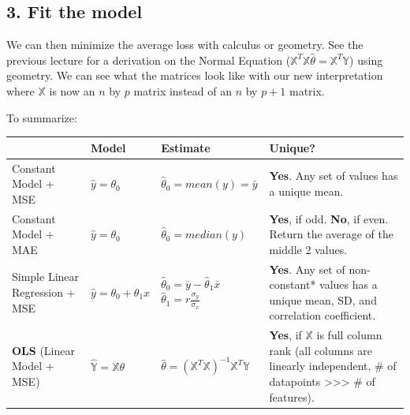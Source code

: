 \documentclass[
  letterpaper,
  DIV=11,
  numbers=noendperiod]{scrreprt}
\begin{document}
\subsection{3. Fit the model}\label{fit-the-model}

We can then minimize the average loss with calculus or geometry. See the
previous lecture for a derivation on the Normal Equation
(\(\mathbb{X}^T \mathbb{X} \hat{\theta} = \mathbb{X}^T \mathbb{Y}\))
using geometry. We can see what the matrices look like with our new
interpretation where \(\mathbb{X}\) is now an \(n\) by \(p\) matrix
instead of an \(n\) by \(p+1\) matrix.

To summarize:

\begin{longtable}[]{@{}
  >{\raggedright\arraybackslash}p{}
  >{\raggedright\arraybackslash}p{}
  >{\raggedright\arraybackslash}p{}
  >{\raggedright\arraybackslash}p{}@{}}
\toprule\noalign{}
\begin{minipage}[b]{\linewidth}\raggedright
\end{minipage} & \begin{minipage}[b]{\linewidth}\raggedright
Model
\end{minipage} & \begin{minipage}[b]{\linewidth}\raggedright
Estimate
\end{minipage} & \begin{minipage}[b]{\linewidth}\raggedright
Unique?
\end{minipage} \\
\midrule\noalign{}
\endhead
\bottomrule\noalign{}
\endlastfoot
Constant Model + MSE & \(\hat{y} = \theta_0\) &
\(\hat{\theta}_0 = mean(y) = \bar{y}\) & \textbf{Yes}. Any set of values
has a unique mean. \\
Constant Model + MAE & \(\hat{y} = \theta_0\) &
\(\hat{\theta}_0 = median(y)\) & \textbf{Yes}, if odd. \textbf{No}, if
even. Return the average of the middle 2 values. \\
Simple Linear Regression + MSE & \(\hat{y} = \theta_0 + \theta_1x\) &
\(\hat{\theta}_0 = \bar{y} - \hat{\theta}_1\bar{x}\)
\(\hat{\theta}_1 = r\frac{\sigma_y}{\sigma_x}\) & \textbf{Yes}. Any set
of non-constant* values has a unique mean, SD, and correlation
coefficient. \\
\textbf{OLS} (Linear Model + MSE) &
\(\mathbb{\hat{Y}} = \mathbb{X}\mathbb{\theta}\) &
\(\hat{\theta} = (\mathbb{X}^T\mathbb{X})^{-1}\mathbb{X}^T\mathbb{Y}\) &
\textbf{Yes}, if \(\mathbb{X}\) is full column rank (all columns are
linearly independent, \# of datapoints
\textgreater\textgreater\textgreater{} \# of features). \\
\end{longtable}
\end{document}
